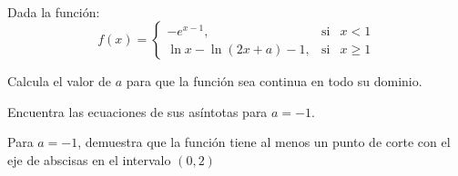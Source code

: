 \ej {}\\
Dada la función:
$$
f(x)=\left\{\begin{array}{lcc}
  -e^{x-1},&\text{si}&x<1\\[5pt]
  \ln{x}-\ln{(2x+a)-1},&\text{si}&x\geqslant1
\end{array}\right.
$$

\begin{apartados}
\ap {} Calcula el valor de $a$ para que la función sea continua en todo su dominio.

\ap {} Encuentra las ecuaciones de sus asíntotas para $a=-1$.

\ap {} Para $a=-1$, demuestra que la función tiene al menos un punto de corte con el 
  eje de abscisas en el intervalo $(0,2)$
\end{apartados}


